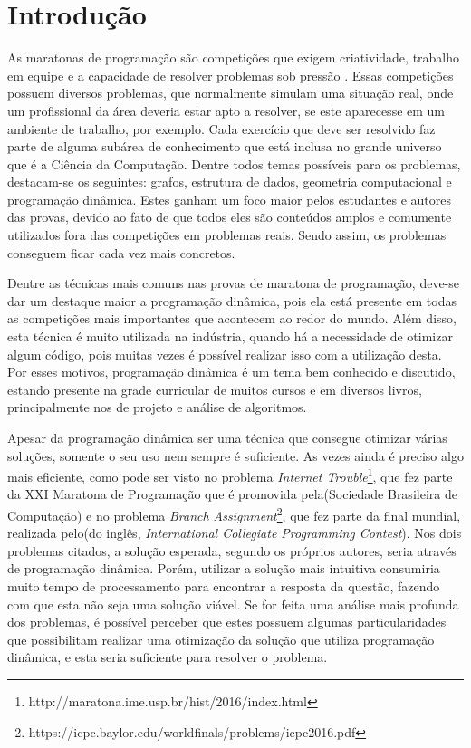 \chapter{Introdu\c{c}\~ao}
\label{chap:introducao}

As maratonas de programação são competições que exigem criatividade, trabalho em equipe e a capacidade de resolver problemas sob pressão \cite{Piekarski2015}. Essas competições possuem diversos problemas, que normalmente simulam uma situação real, onde um profissional da área deveria estar apto a resolver, se este aparecesse em um ambiente de trabalho, por exemplo. Cada exercício que deve ser resolvido faz parte de alguma subárea de conhecimento que está inclusa no grande universo que é a Ciência da Computação. Dentre todos temas possíveis para os problemas, destacam-se os seguintes: grafos, estrutura de dados, geometria computacional e programação dinâmica. Estes ganham um foco maior pelos estudantes e autores das provas, devido ao fato de que todos eles são conteúdos amplos e comumente utilizados fora das competições em problemas reais. Sendo assim, os problemas conseguem ficar cada vez mais concretos.

Dentre as técnicas mais comuns nas provas de maratona de programação, deve-se dar um destaque maior a programação dinâmica, pois ela está presente em todas as competições mais importantes que acontecem ao redor do mundo. Além disso, esta técnica é muito utilizada na indústria, quando há a necessidade de otimizar algum código, pois muitas vezes é possível realizar isso com a utilização desta. Por esses motivos, programação dinâmica é um tema bem conhecido e discutido, estando presente na grade curricular de muitos cursos e em diversos livros, principalmente nos de projeto e análise de algoritmos.

Apesar da programação dinâmica ser uma técnica que consegue otimizar várias soluções, somente o seu uso nem sempre é suficiente. As vezes ainda é preciso algo mais eficiente, como pode ser visto no problema \textit{Internet Trouble}\footnote{http://maratona.ime.usp.br/hist/2016/index.html}, que fez parte da XXI Maratona de Programação que é promovida pela(Sociedade Brasileira de Computação) e no problema \textit{Branch Assignment}\footnote{https://icpc.baylor.edu/worldfinals/problems/icpc2016.pdf}, que fez parte da final mundial, realizada pelo(do inglês, \textit{International Collegiate Programming Contest}). Nos dois problemas citados, a solução esperada, segundo os próprios autores, seria através de programação dinâmica. Porém, utilizar a solução mais intuitiva consumiria muito tempo de processamento para encontrar a resposta da questão, fazendo com que esta não seja uma solução viável. Se for feita uma análise mais profunda dos problemas, é possível perceber que estes possuem algumas particularidades que possibilitam realizar uma otimização da solução que utiliza programação dinâmica, e esta seria suficiente para resolver o problema.

